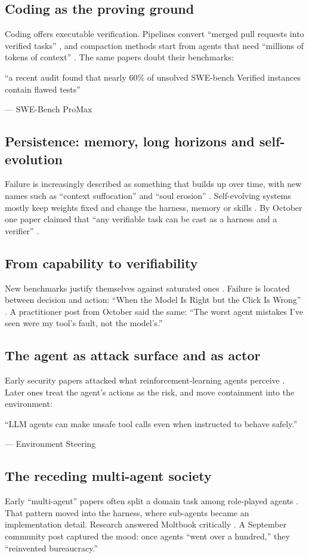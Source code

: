 \documentclass[10.5pt]{article}
\newcommand{\ex}[2]{\par\begin{tcolorbox}[enhanced, colback=white, colframe=white, borderline west={1.5pt}{0pt}{lavline}, left=9pt, right=4pt, top=1pt, bottom=1pt, fontupper=\small\itshape\color{body}]\enquote{#1}\par\hfill{\normalfont\footnotesize\color{muted}--- #2}\end{tcolorbox}}
\begin{document}
\subsection{Coding as the proving ground}
Coding offers executable verification. Pipelines convert \enquote{merged pull requests into verified tasks} \cite{change2task}, and compaction methods start from agents that need \enquote{millions of tokens of context} \cite{cliff}. The same papers doubt their benchmarks:
\ex{a recent audit found that nearly 60\% of unsolved SWE-bench Verified instances contain flawed tests}{SWE-Bench ProMax \cite{promax}}

\subsection{Persistence: memory, long horizons and self-evolution}
Failure is increasingly described as something that builds up over time, with new names such as \enquote{context suffocation} \cite{iterresearch} and \enquote{soul erosion} \cite{bmam}. Self-evolving systems mostly keep weights fixed and change the harness, memory or skills \cite{reasoningbank,evoharness}. By October one paper claimed that \enquote{any verifiable task can be cast as a harness and a verifier} \cite{lastrs}.

\subsection{From capability to verifiability}
New benchmarks justify themselves against saturated ones \cite{frontierfinance}. Failure is located between decision and action: \enquote{When the Model Is Right but the Click Is Wrong} \cite{webfovea}. A practitioner post from October said the same: \enquote{The worst agent mistakes I've seen were my tool's fault, not the model's.}

\subsection{The agent as attack surface and as actor}
Early security papers attacked what reinforcement-learning agents perceive \cite{vln}. Later ones treat the agent's actions as the risk, and move containment into the environment:
\ex{LLM agents can make unsafe tool calls even when instructed to behave safely.}{Environment Steering \cite{envsteer}}

\subsection{The receding multi-agent society}
Early \enquote{multi-agent} papers often split a domain task among role-played agents \cite{eduagent,medtutor,jingfang,anubuddhi}. That pattern moved into the harness, where sub-agents became an implementation detail. Research answered Moltbook critically \cite{moltbookpaper}. A September community post captured the mood: once agents \enquote{went over a hundred,} they \enquote{reinvented bureaucracy.}
\end{document}
